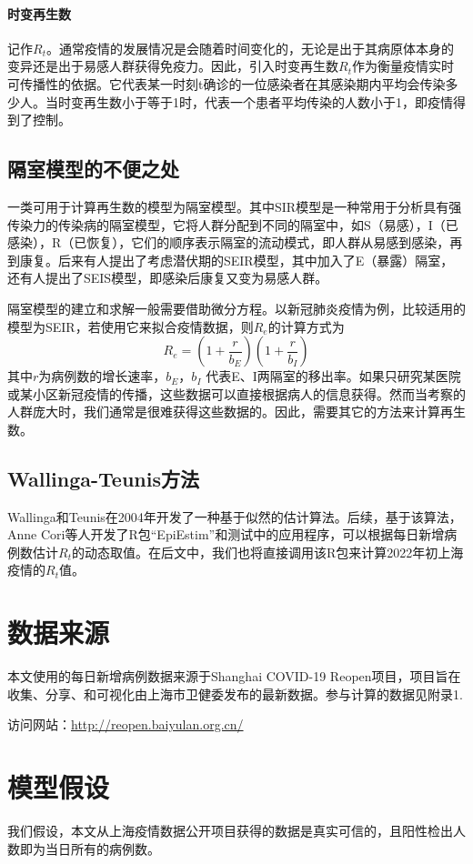\documentclass[a4paper,12pt,onecolumn,twoside]{article}
\begin{document}
\paragraph{时变再生数~}记作$R_{t}$。通常疫情的发展情况是会随着时间变化的，无论是出于其病原体本身的变异还是出于易感人群获得免疫力。因此，引入时变再生数$R_{t}$作为衡量疫情实时可传播性的依据。它代表某一时刻t确诊的一位感染者在其感染期内平均会传染多少人。当时变再生数小于等于1时，代表一个患者平均传染的人数小于1，即疫情得到了控制。
\subsection{隔室模型的不便之处}
一类可用于计算再生数的模型为隔室模型。其中SIR模型是一种常用于分析具有强传染力的传染病的隔室模型，它将人群分配到不同的隔室中，如S（易感），I（已感染），R（已恢复），它们的顺序表示隔室的流动模式，即人群从易感到感染，再到康复。后来有人提出了考虑潜伏期的SEIR模型，其中加入了E（暴露）隔室，还有人提出了SEIS模型，即感染后康复又变为易感人群。\par 
隔室模型的建立和求解一般需要借助微分方程。以新冠肺炎疫情为例，比较适用的模型为SEIR，若使用它来拟合疫情数据，则$R_{e}$的计算方式为
$$R_{e}=(1+\frac{r}{b_{E}})(1+\frac{r}{b_{I}})$$
其中$r$为病例数的增长速率，$b_{E}$，$b_{I}$ 代表E、I两隔室的移出率。如果只研究某医院或某小区新冠疫情的传播，这些数据可以直接根据病人的信息获得。然而当考察的人群庞大时，我们通常是很难获得这些数据的。因此，需要其它的方法来计算再生数。
\subsection{Wallinga-Teunis方法}
Wallinga和Teunis在2004年开发了一种基于似然的估计算法\cite{10.1093/aje/kwh255}。后续，基于该算法，Anne Cori等人开发了R包“EpiEstim”和测试中的应用程序\cite{10.1093/aje/kwt133}，可以根据每日新增病例数估计$R_{t}$的动态取值。在后文中，我们也将直接调用该R包来计算2022年初上海疫情的$R_{t}$值。
\section{数据来源}
本文使用的每日新增病例数据来源于Shanghai COVID-19 Reopen项目，项目旨在收集、分享、和可视化由上海市卫健委发布的最新数据。参与计算的数据见附录1.\par 
访问网站：\href{http://reopen.baiyulan.org.cn/}{http://reopen.baiyulan.org.cn/}
\section{模型假设}
我们假设，本文从上海疫情数据公开项目获得的数据是真实可信的，且阳性检出人数即为当日所有的病例数。
\end{document}
